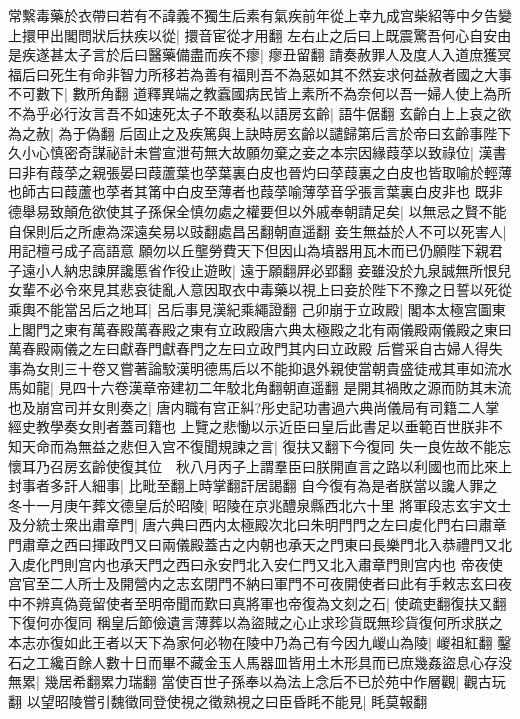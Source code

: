 常繫毒藥於衣帶曰若有不諱義不獨生后素有氣疾前年從上幸九成宫柴紹等中夕告變上擐甲出閣問狀后扶疾以從|{
	擐音宦從才用翻}
左右止之后曰上既震驚吾何心自安由是疾遂甚太子言於后曰醫藥備盡而疾不瘳|{
	瘳丑留翻}
請奏赦罪人及度人入道庶獲冥福后曰死生有命非智力所移若為善有福則吾不為惡如其不然妄求何益赦者國之大事不可數下|{
	數所角翻}
道釋異端之教蠧國病民皆上素所不為奈何以吾一婦人使上為所不為乎必行汝言吾不如速死太子不敢奏私以語房玄齡|{
	語牛倨翻}
玄齡白上上哀之欲為之赦|{
	為于偽翻}
后固止之及疾篤與上訣時房玄齡以譴歸第后言於帝曰玄齡事陛下久小心慎密奇謀祕計未嘗宣泄苟無大故願勿棄之妾之本宗因緣葭莩以致祿位|{
	漢書曰非有葭莩之親張晏曰葭蘆葉也莩葉裏白皮也晉灼曰莩葭裏之白皮也皆取喻於輕薄也師古曰葭蘆也莩者其筩中白皮至薄者也葭莩喻薄莩音孚張言葉裏白皮非也}
既非德舉易致顛危欲使其子孫保全慎勿處之權要但以外戚奉朝請足矣|{
	以無忌之賢不能自保則后之所慮為深遠矣易以豉翻處昌呂翻朝直遥翻}
妾生無益於人不可以死害人|{
	用記檀弓成子高語意}
願勿以丘壟勞費天下但因山為墳器用瓦木而已仍願陛下親君子遠小人納忠諫屏讒慝省作役止遊畋|{
	遠于願翻屛必郢翻}
妾雖没於九泉誠無所恨兒女輩不必令來見其悲哀徒亂人意因取衣中毒藥以視上曰妾於陛下不豫之日誓以死從乘輿不能當呂后之地耳|{
	呂后事見漢紀乘繩證翻}
己卯崩于立政殿|{
	閣本太極宫圖東上閣門之東有萬春殿萬春殿之東有立政殿唐六典太極殿之北有兩儀殿兩儀殿之東曰萬春殿兩儀之左曰獻春門獻春門之左曰立政門其内曰立政殿}
后嘗采自古婦人得失事為女則三十卷又嘗著論駮漢明德馬后以不能抑退外親使當朝貴盛徒戒其車如流水馬如龍|{
	見四十六卷漢章帝建初二年駮北角翻朝直遥翻}
是開其禍敗之源而防其末流也及崩宫司并女則奏之|{
	唐内職有宫正糾?彤史記功書過六典尚儀局有司籍二人掌經史教學奏女則者蓋司籍也}
上覽之悲慟以示近臣曰皇后此書足以垂範百世朕非不知天命而為無益之悲但入宫不復聞規諫之言|{
	復扶又翻下今復同}
失一良佐故不能忘懷耳乃召房玄齡使復其位　秋八月丙子上謂羣臣曰朕開直言之路以利國也而比來上封事者多訐人細事|{
	比毗至翻上時掌翻訐居謁翻}
自今復有為是者朕當以讒人罪之　冬十一月庚午葬文德皇后於昭陵|{
	昭陵在京兆醴泉縣西北六十里}
將軍段志玄宇文士及分統士衆出肅章門|{
	唐六典曰西内太極殿次北曰朱明門門之左曰䖍化門右曰肅章門肅章之西曰揮政門又曰兩儀殿蓋古之内朝也承天之門東曰長樂門北入恭禮門又北入䖍化門則宫内也承天門之西曰永安門北入安仁門又北入肅章門則宫内也}
帝夜使宫官至二人所士及開營内之志玄閉門不納曰軍門不可夜開使者曰此有手敕志玄曰夜中不辨真偽竟留使者至明帝聞而歎曰真將軍也帝復為文刻之石|{
	使疏吏翻復扶又翻下復何亦復同}
稱皇后節儉遺言薄葬以為盜賊之心止求珍貨既無珍貨復何所求朕之本志亦復如此王者以天下為家何必物在陵中乃為己有今因九嵕山為陵|{
	嵕祖紅翻}
鑿石之工纔百餘人數十日而畢不藏金玉人馬器皿皆用土木形具而已庶幾姦盜息心存没無累|{
	幾居希翻累力瑞翻}
當使百世子孫奉以為法上念后不已於苑中作層觀|{
	觀古玩翻}
以望昭陵嘗引魏徵同登使視之徵熟視之曰臣昏眊不能見|{
	眊莫報翻}
